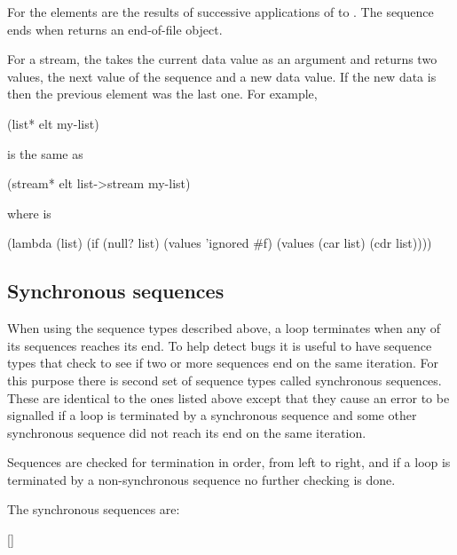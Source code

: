 For  the elements are the results of successive applications
 of  to .
The sequence ends when  returns an end-of-file object.

For a stream, the  takes the current data value as an argument
 and returns two values, the next value of the sequence and a new data value.
If the new data is  then the previous element was the last
 one.  For example,
\begin{example}
  (list* elt my-list)
\end{example}
 is the same as
\begin{example}
  (stream* elt list->stream my-list)
\end{example}
 where  is
\begin{example}
  (lambda (list)
    (if (null? list)
        (values 'ignored \#f)
        (values (car list) (cdr list))))
\end{example}

\subsection{Synchronous sequences}

When using the sequence types described above, a loop terminates when any of
its sequences reaches its end.  To help detect bugs it is useful to have
sequence types that check to see if two or more sequences end on the same
iteration.  For this purpose there is second set of sequence types called
synchronous sequences.  These are identical to the ones listed above except
that they cause an error to be signalled if a loop is terminated by a
synchronous sequence and some other synchronous sequence did not reach its
end on the same iteration.

Sequences are checked for termination in order, from left to right, and
if a loop is terminated by a non-synchronous sequence no further checking
is done.

The synchronous sequences are:

\begin{protos}
 {    []}
 {   }
 {   }
\end{protos}

